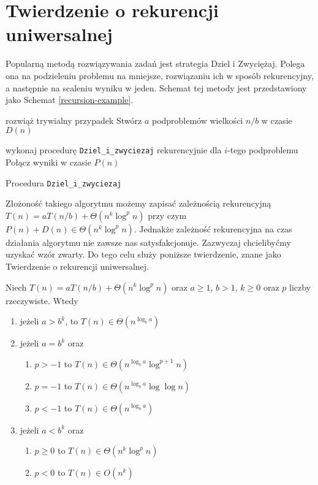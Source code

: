 \section{Twierdzenie o rekurencji uniwersalnej}

Popularną metodą rozwiązywania zadań jest strategia Dziel i Zwyciężaj.
Polega ona na podzieleniu problemu na mniejsze, rozwiązaniu ich w sposób rekurencyjny, a następnie na scaleniu wyniku w jeden.
Schemat tej metody jest przedstawiony jako Schemat \ref{recursion-example}.
\begin{algorithm}[h]
  \DontPrintSemicolon
    
  {
    rozwiąż trywialny przypadek
  }
  Stwórz $a$ podproblemów wielkości $n/b$ w czasie $D(n)$
  
  
  {
   	wykonaj procedurę \texttt{Dziel\_i\_zwyciezaj} rekurencyjnie dla $i$-tego podproblemu
  }
  Połącz wyniki w czasie $P(n)$
  \caption{Procedura \texttt{Dziel\_i\_zwyciezaj}}
  \label{recursion-example}
\end{algorithm}

Złożoność takiego algorytmu możemy zapisać zależnością rekurencyjną $T(n) = aT(n/b) + \Theta(n^k \log^{p} n)$ przy czym $P(n) + D(n) \in \Theta(n^k \log^{p} n)$.
Jednakże zależność rekurencyjna na czas działania algorytmu nie zawsze nas satysfakcjonuje.
Zazwyczaj chcielibyćmy uzyskać wzór zwarty.
Do tego celu służy poniższe twierdzenie, znane jako Twierdzenie o rekurencji uniwersalnej.

\begin{theorem}
 Niech $T(n) = aT(n/b) + \Theta(n^k \log^{p} n)$ oraz $a \geq 1$, $b > 1$, $k \geq 0$ oraz $p$ liczby rzeczywiste.
 Wtedy
\begin{enumerate}
\item jeżeli $a > b^k$, to $T(n) \in \Theta(n^{\log_b a})$ \label{mt-1}
\item jeżeli $a = b^k$ oraz 
\begin{enumerate}
 \item $p > -1$ to $T(n) \in \Theta(n^{\log_b a} \log^{p + 1} n)$ \label{mt-2a}
 \item $p = -1$ to $T(n) \in \Theta(n^{\log_b a} \log \log n)$ \label{mt-2b}
 \item $p < -1$ to $T(n) \in \Theta(n^{\log_b a})$ \label{mt-2c}
\end{enumerate}
\item jeżeli $a < b^k$ oraz
\begin{enumerate}
 \item $p \geq 0$ to $T(n) \in \Theta(n^k \log^{p} n)$ \label{mt-3a}
 \item $p < 0$ to $T(n) \in O(n^k)$ \label{mt-3b}
\end{enumerate}
\end{enumerate}
 \label{Master}
\end{theorem}

